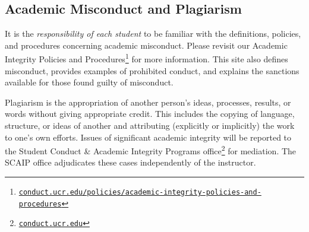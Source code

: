 \documentclass[12pt]{article}
\newcommand{\footlink}[1]{\footnote{\href{https://#1}{\texttt{#1}}}}
\newcommand\acro[1]{{\small {#1}}}
\numberwithin{equation}{section}    %
\begin{document}
\subsection{Academic Misconduct and Plagiarism}

It is the \emph{responsibility of each student} to be familiar with the definitions, policies, and procedures concerning academic misconduct. Please revisit our Academic Integrity Policies and Procedures\footlink{conduct.ucr.edu/policies/academic-integrity-policies-and-procedures} for more information. This site also defines misconduct, provides examples of prohibited conduct, and explains the sanctions available for those found guilty of misconduct.

Plagiarism is the appropriation of another person's ideas, processes, results, or words without giving appropriate credit. This includes the copying of language, structure, or ideas of another and attributing (explicitly or implicitly) the work to one's own efforts. Issues of significant academic integrity will be reported to the Student Conduct \& Academic Integrity Programs office\footlink{conduct.ucr.edu} for mediation. The \acro{SCAIP} office adjudicates these cases independently of the instructor.
\end{document}
